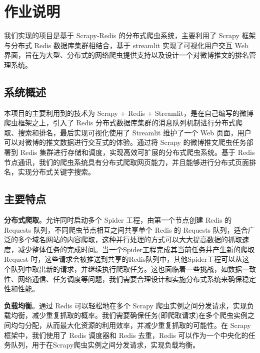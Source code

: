 \documentclass[12pt,hyperref,a4paper,UTF8]{ctexart}
\begin{document}
\cover

\thispagestyle{empty} %

\newpage
\tableofcontents

\newpage


\section{作业说明}
我们实现的项目是基于 Scrapy-Redis 的分布式爬虫系统，主要利用了 Scrapy 框架与分布式 Redis 数据库集群相结合，基于 streamlit 实现了可视化用户交互 Web 界面，旨在为大型、分布式的网络爬虫提供支持以及设计一个对微博推文的排名管理系统。

\subsection{系统概述}

本项目的主要利用到的技术为 Scrapy + Redis + Streamlit，是在自己编写的微博爬虫框架之上，引入了 Redis 分布式数据库集群的消息队列机制进行分布式爬取、搜索和排名，最后实现可视化使用了 Streamlit 维护了一个 Web 页面，用户可以对微博的推文数据进行交互式的体验。通过将 Scrapy 的微博推文爬虫任务部署到 Redis 集群进行存储和调度，实现高效可扩展的分布式爬虫系统。基于 Redis 节点通讯，我们的爬虫系统具有分布式爬取网页能力，并且能够进行分布式页面排名，实现分布式关键字搜索。

\subsection{主要特点}

\textbf{分布式爬取}。允许同时启动多个 Spider 工程，由第一个节点创建 Redis 的 Requests 队列，不同爬虫节点相互之间共享单个 Redis 的 Requests 队列，适合广泛的多个域名网站的内容爬取，这种并行处理的方式可以大大提高数据的抓取速度，减少整体任务的完成时间。当一个Spider工程完成其当前任务并产生新的爬取 Request 时，这些请求会被推送到共享的Redis队列中，其他Spider工程可以从这个队列中取出新的请求，并继续执行爬取任务。这也面临着一些挑战，如数据一致性、网络通信、任务调度等问题，我们需要合理设计和实施分布式系统来确保稳定性和性能。

\textbf{负载均衡}。通过 Redis 可以轻松地在多个 Scrapy 爬虫实例之间分发请求，实现负载均衡，减少重复抓取的概率。我们需要确保任务(即爬取请求)在多个爬虫实例之间均匀分配，从而最大化资源的利用效率，并减少重复抓取的可能性。在 Scrapy 框架中，我们使用了 Redis 调度器和 Redis 去重，Redis 可以作为一个中央化的任务队列，用于在Scrapy爬虫实例之间分发请求，实现负载均衡。
\end{document}

